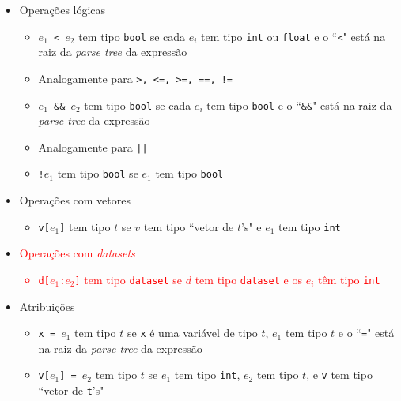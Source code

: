 \documentclass[12pt]{article}
\newcommand{\red}{\textcolor{red}}
\begin{document}
\begin{itemize}
\begin{itemize}
    {\tt int} e o ``{\tt +}" está na raiz da {\it parse tree} da expressão
    \item {\tt $e_1$ + $e_2$} tem tipo {\tt real} se cada $e_i$ tem tipo
    {\tt int} ou {\tt real}, pelo menos um dos $e_i$ tem tipo {\tt real}
    e o ``{\tt +}" está na raiz da {\it parse tree} da expressão
    \item Analogamente para {\tt -, *} e {\tt /}
    \end{itemize}
\item Operações lógicas
	\begin{itemize}
    \item {\tt $e_1$ < $e_2$} tem tipo {\tt bool} se cada $e_i$ tem tipo
    {\tt int} ou {\tt float} e o ``{\tt <}" está na raiz da {\it parse tree} da
    expressão
    \item Analogamente para {\tt >, <=, >=, ==, !=}
    \item {\tt $e_1$ \&\& $e_2$} tem tipo {\tt bool} se cada $e_i$ tem tipo
    {\tt bool} e o ``{\tt \&\&}" está na raiz da {\it parse tree} da expressão
    \item Analogamente para {\tt ||}
    \item {\tt !$e_1$} tem tipo {\tt bool} se $e_1$ tem tipo {\tt bool}
    \end{itemize}
\item Operações com vetores
	\begin{itemize}
    \item {\tt v[$e_1$]} tem tipo $t$ se $v$ tem tipo ``vetor de $t$'s"
    e $e_1$ tem tipo {\tt int}
    \end{itemize}
\item \red{Operações com {\it datasets}
	\begin{itemize}
    \item {\tt d[$e_1$:$e_2$]} tem tipo {\tt dataset} se
    $d$ tem tipo {\tt dataset}
    e os $e_i$ têm tipo {\tt int}
    \end{itemize}}
\item Atribuições
	\begin{itemize}
    \item {\tt x = $e_1$} tem tipo $t$ se 
    {\tt x} é uma variável de tipo $t$,
    $e_1$ tem tipo $t$ e
    o ``{\tt =}" está na raiz da {\it parse tree} da expressão
    \item {\tt v[$e_1$] = $e_2$} tem tipo $t$ se 
    $e_1$ tem tipo {\tt int},
    $e_2$ tem tipo $t$, e
    {\tt v} tem tipo ``vetor de {\tt t}'s"
    
    \end{itemize}
\end{itemize}
\end{document}
